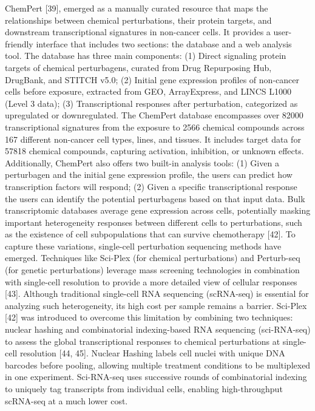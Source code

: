 ChemPert [39], emerged as a manually curated resource that maps the relationships between chemical perturbations, their protein targets, and downstream transcriptional signatures in non-cancer cells. It provides a user-friendly interface that includes two sections: the database and a web analysis tool. The database has three main components: (1) Direct signaling protein targets of chemical perturbagens, curated from Drug Repurposing Hub, DrugBank, and STITCH v5.0; (2) Initial gene expression profiles of non-cancer cells before exposure, extracted from GEO, ArrayExpress, and LINCS L1000 (Level 3 data); (3) Transcriptional responses after perturbation, categorized as upregulated or downregulated. The ChemPert database encompasses over 82000 transcriptional signatures from the exposure to 2566 chemical compounds across 167 different non-cancer cell types, lines, and tissues. It includes target data for 57818 chemical compounds, capturing activation, inhibition, or unknown effects. Additionally, ChemPert also offers two built-in analysis tools: (1) Given a perturbagen and the initial gene expression profile, the users can predict how transcription factors will respond; (2) Given a specific transcriptional response the users can identify the potential perturbagens based on that input data. 
Bulk transcriptomic databases average gene expression across cells, potentially masking important heterogeneity responses between different cells to perturbations, such as the existence of cell subpopulations that can survive chemotherapy [42]. To capture these variations, single-cell perturbation sequencing methods have emerged. Techniques like Sci-Plex (for chemical perturbations) and Perturb-seq (for genetic perturbations) leverage mass screening technologies in combination with single-cell resolution to provide a more detailed view of cellular responses [43]. Although traditional single-cell RNA sequencing (scRNA-seq) is essential for analyzing such heterogeneity, its high cost per sample remains a barrier. Sci-Plex [42] was introduced to overcome this limitation by combining two techniques: nuclear hashing and combinatorial indexing-based RNA sequencing (sci-RNA-seq) to assess the global transcriptional responses to chemical perturbations at single-cell resolution [44, 45]. Nuclear Hashing labels cell nuclei with unique DNA barcodes before pooling, allowing multiple treatment conditions to be multiplexed in one experiment. Sci-RNA-seq uses successive rounds of combinatorial indexing to uniquely tag transcripts from individual cells, enabling high-throughput scRNA-seq at a much lower cost.

